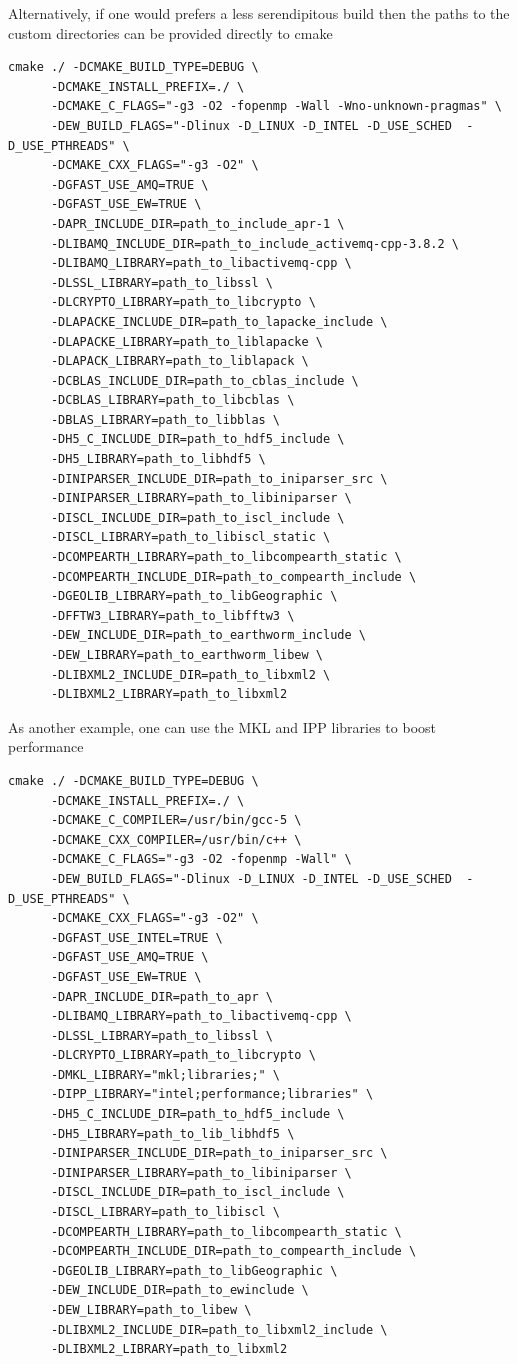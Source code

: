 \documentclass[12pt]{article}
\begin{document}
Alternatively, if one would prefers a less serendipitous build then the paths to the custom
directories can be provided directly to cmake  
\begin{verbatim}
cmake ./ -DCMAKE_BUILD_TYPE=DEBUG \
      -DCMAKE_INSTALL_PREFIX=./ \
      -DCMAKE_C_FLAGS="-g3 -O2 -fopenmp -Wall -Wno-unknown-pragmas" \
      -DEW_BUILD_FLAGS="-Dlinux -D_LINUX -D_INTEL -D_USE_SCHED  -D_USE_PTHREADS" \
      -DCMAKE_CXX_FLAGS="-g3 -O2" \
      -DGFAST_USE_AMQ=TRUE \
      -DGFAST_USE_EW=TRUE \      
      -DAPR_INCLUDE_DIR=path_to_include_apr-1 \
      -DLIBAMQ_INCLUDE_DIR=path_to_include_activemq-cpp-3.8.2 \
      -DLIBAMQ_LIBRARY=path_to_libactivemq-cpp \
      -DLSSL_LIBRARY=path_to_libssl \
      -DLCRYPTO_LIBRARY=path_to_libcrypto \
      -DLAPACKE_INCLUDE_DIR=path_to_lapacke_include \
      -DLAPACKE_LIBRARY=path_to_liblapacke \
      -DLAPACK_LIBRARY=path_to_liblapack \
      -DCBLAS_INCLUDE_DIR=path_to_cblas_include \
      -DCBLAS_LIBRARY=path_to_libcblas \
      -DBLAS_LIBRARY=path_to_libblas \
      -DH5_C_INCLUDE_DIR=path_to_hdf5_include \
      -DH5_LIBRARY=path_to_libhdf5 \
      -DINIPARSER_INCLUDE_DIR=path_to_iniparser_src \
      -DINIPARSER_LIBRARY=path_to_libiniparser \
      -DISCL_INCLUDE_DIR=path_to_iscl_include \
      -DISCL_LIBRARY=path_to_libiscl_static \
      -DCOMPEARTH_LIBRARY=path_to_libcompearth_static \
      -DCOMPEARTH_INCLUDE_DIR=path_to_compearth_include \
      -DGEOLIB_LIBRARY=path_to_libGeographic \
      -DFFTW3_LIBRARY=path_to_libfftw3 \
      -DEW_INCLUDE_DIR=path_to_earthworm_include \
      -DEW_LIBRARY=path_to_earthworm_libew \
      -DLIBXML2_INCLUDE_DIR=path_to_libxml2 \
      -DLIBXML2_LIBRARY=path_to_libxml2
\end{verbatim}
As another example, one can use the MKL and IPP libraries to boost performance 
\begin{verbatim}
cmake ./ -DCMAKE_BUILD_TYPE=DEBUG \
      -DCMAKE_INSTALL_PREFIX=./ \
      -DCMAKE_C_COMPILER=/usr/bin/gcc-5 \
      -DCMAKE_CXX_COMPILER=/usr/bin/c++ \
      -DCMAKE_C_FLAGS="-g3 -O2 -fopenmp -Wall" \
      -DEW_BUILD_FLAGS="-Dlinux -D_LINUX -D_INTEL -D_USE_SCHED  -D_USE_PTHREADS" \
      -DCMAKE_CXX_FLAGS="-g3 -O2" \
      -DGFAST_USE_INTEL=TRUE \
      -DGFAST_USE_AMQ=TRUE \
      -DGFAST_USE_EW=TRUE \      
      -DAPR_INCLUDE_DIR=path_to_apr \
      -DLIBAMQ_LIBRARY=path_to_libactivemq-cpp \
      -DLSSL_LIBRARY=path_to_libssl \
      -DLCRYPTO_LIBRARY=path_to_libcrypto \
      -DMKL_LIBRARY="mkl;libraries;" \
      -DIPP_LIBRARY="intel;performance;libraries" \
      -DH5_C_INCLUDE_DIR=path_to_hdf5_include \
      -DH5_LIBRARY=path_to_lib_libhdf5 \
      -DINIPARSER_INCLUDE_DIR=path_to_iniparser_src \
      -DINIPARSER_LIBRARY=path_to_libiniparser \
      -DISCL_INCLUDE_DIR=path_to_iscl_include \
      -DISCL_LIBRARY=path_to_libiscl \
      -DCOMPEARTH_LIBRARY=path_to_libcompearth_static \
      -DCOMPEARTH_INCLUDE_DIR=path_to_compearth_include \      
      -DGEOLIB_LIBRARY=path_to_libGeographic \
      -DEW_INCLUDE_DIR=path_to_ewinclude \
      -DEW_LIBRARY=path_to_libew \
      -DLIBXML2_INCLUDE_DIR=path_to_libxml2_include \
      -DLIBXML2_LIBRARY=path_to_libxml2
\end{verbatim}
\end{document}
